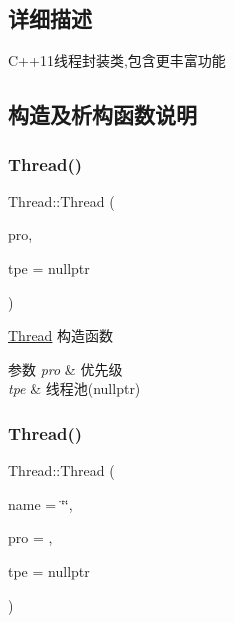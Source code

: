 \subsection{详细描述}
C++11线程封装类,包含更丰富功能 

\subsection{构造及析构函数说明}
\mbox{\label{classThread_a2375aeb8a227668652d593b180bac64e}} 
\subsubsection{\texorpdfstring{Thread()}{Thread()}\hspace{0.1cm}{\footnotesize\ttfamily [1/3]}}
{\footnotesize\ttfamily Thread\+::\+Thread (\begin{DoxyParamCaption}\item[{int}]{pro,  }\item[{\hyperlink{classThreadPoolExecutor}{Thread\+Pool\+Executor} $\ast$}]{tpe = {\ttfamily nullptr} }\end{DoxyParamCaption})\hspace{0.3cm}{\ttfamily [inline]}}



\hyperlink{classThread}{Thread} 构造函数 


\begin{DoxyParams}{参数}
{\em pro} & 优先级 \\
\hline
{\em tpe} & 线程池(nullptr) \\
\hline
\end{DoxyParams}
\mbox{\label{classThread_aa32c32f43d92d235c9e795bea80e9058}} 
\subsubsection{\texorpdfstring{Thread()}{Thread()}\hspace{0.1cm}{\footnotesize\ttfamily [2/3]}}
{\footnotesize\ttfamily Thread\+::\+Thread (\begin{DoxyParamCaption}\item[{const std\+::string \&}]{name = {\ttfamily \char`\"{}\char`\"{}},  }\item[{int}]{pro = {},  }\item[{\hyperlink{classThreadPoolExecutor}{Thread\+Pool\+Executor} $\ast$}]{tpe = {\ttfamily nullptr} }\end{DoxyParamCaption})\hspace{0.3cm}{\ttfamily [inline]}}



